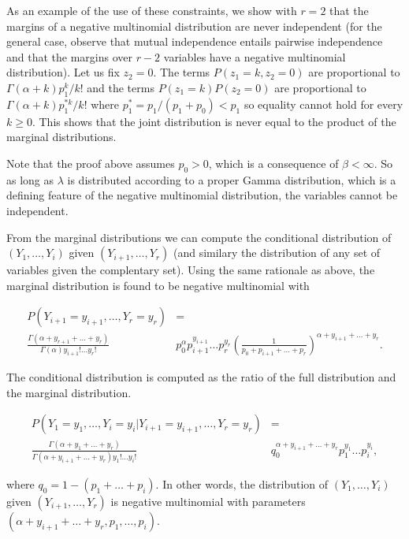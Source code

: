 \documentclass[12pt]{article}
\begin{document}
\begin{appendices}
    As an example of the use of these constraints, we 
    show with $r=2$ that the margins of a negative multinomial
    distribution are never independent (for the general case,
    observe that mutual independence entails pairwise independence
    and that the margins over $r-2$ variables have a negative
    multinomial distribution). Let us fix $z_2 = 0$. The terms
    $P(z_1 = k, z_2 = 0)$ are proportional to
    $\Gamma(\alpha+k) p_1^k/k!$ and the terms $P(z_1 = k)P(z_2 = 0)$
    are proportional to $\Gamma(\alpha+k) p_1^{*k}/k!$ where
    $p_1^* = p_1 / (p_1 + p_0) < p_1$ so equality cannot hold
    for every $k \geq 0$. This shows that the joint distribution
    is never equal to the product of the marginal distributions.

    Note that the proof above assumes $p_0 > 0$, which is
    a consequence of $\beta < \infty$. So as long as $\lambda$ is 
    distributed according to a proper Gamma distribution, which
    is a defining feature of the negative multinomial distribution, the
    variables cannot be independent.

    From the marginal distributions we can compute the conditional
    distribution of $(Y_1, \ldots, Y_i)$ given $(Y_{i+1}, \ldots, Y_r)$
    (and similary the distribution of any set of variables given
    the complentary set). Using the same rationale as above, the
    marginal distribution is found to be negative multinomial with

    \begin{align*}
    P(Y_{i+1}=y_{i+1}, \ldots, Y_r=y_r) &= \\
      \frac{\Gamma(\alpha + y_{r+1} + \ldots + y_r)}
      {\Gamma(\alpha)y_{i+1}! \ldots y_r!} &p_0^{\alpha}p_{i+1}^{y_{i+1}}
      \ldots p_r^{y_r} \left(\frac{1}{p_0 + p_{i+1} + \ldots + p_r}
      \right)^{\alpha+y_{i+1} + \ldots + y_r}.
    \end{align*}

    The conditional distribution is computed as the ratio of the
    full distribution and the marginal distribution.

    \begin{align*}
      P(Y_1=y_1, \ldots, Y_i=y_i|Y_{i+1}=y_{i+1}, \ldots, Y_r=y_r) &= \\
      \frac{\Gamma(\alpha + y_1 + \ldots + y_r)}
      {\Gamma(\alpha+y_{i+1}+\ldots+y_r)y_1! \ldots y_i!}
      &q_0^{\alpha+y_{i+1}+\ldots+y_r}p_1^{y_1} \ldots p_i^{y_i},
    \end{align*}

    \noindent
    where $q_0 = 1-(p_1+\ldots+p_i)$. In other words, the
    distribution of $(Y_1, \ldots, Y_i)$ given $(Y_{i+1}, \ldots, Y_r)$
    is negative multinomial with parameters
    $(\alpha+y_{i+1}+\ldots+y_r, p_1, \ldots, p_i)$.


\end{appendices}
\end{document}
